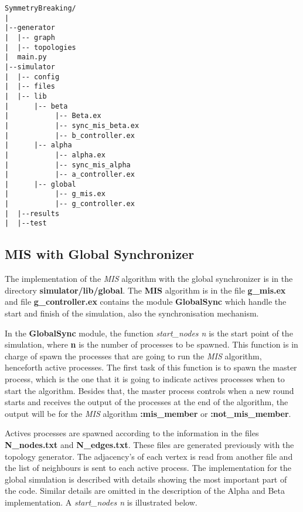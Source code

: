 \begin{verbatim}
SymmetryBreaking/
|
|--generator
|  |-- graph
|  |-- topologies
|  main.py
|--simulator
|  |-- config
|  |-- files
|  |-- lib
|      |-- beta
|           |-- Beta.ex
|           |-- sync_mis_beta.ex
|           |-- b_controller.ex
|      |-- alpha
|           |-- alpha.ex
|           |-- sync_mis_alpha
|           |-- a_controller.ex
|      |-- global
|           |-- g_mis.ex
|           |-- g_controller.ex
|  |--results
|  |--test
\end{verbatim}

\subsection{MIS with Global Synchronizer}
 
The implementation of the \textit{MIS} algorithm with the global synchronizer is in the directory \textbf{simulator/lib/global}. The \textbf{MIS} algorithm is in the file \textbf{g\_mis.ex} and file \textbf{g\_controller.ex} contains the module \textbf{GlobalSync} which handle the start and finish of the simulation, also the synchronisation mechanism. 

In the \textbf{GlobalSync} module, the function \textit{start\_nodes n} is the start point of the simulation, where \textbf{n} is the number of processes to be spawned. This function is in charge of spawn the processes that are going to run the \textit{MIS} algorithm, henceforth active processes. The first task of this function is to spawn the master process, which is the one that it is going to indicate actives processes when to start the algorithm.  Besides that, the master process controls when a new round starts and receives the output of the processes at the end of the algorithm, the output will be for the \textit{MIS} algorithm \textbf{:mis\_member} or \textbf{:not\_mis\_member}. 

Actives processes are spawned according to the information in the files  \textbf{N\_nodes.txt} and \textbf{N\_edges.txt}. These files are generated previously with the topology generator. The adjacency's of each vertex is read from another file and the list of neighbours is sent to each active process. The implementation for the global simulation is described with details showing the most important part of the code. Similar details are omitted in the description of the Alpha and Beta implementation. A \textit{start\_nodes n} is illustrated below.



